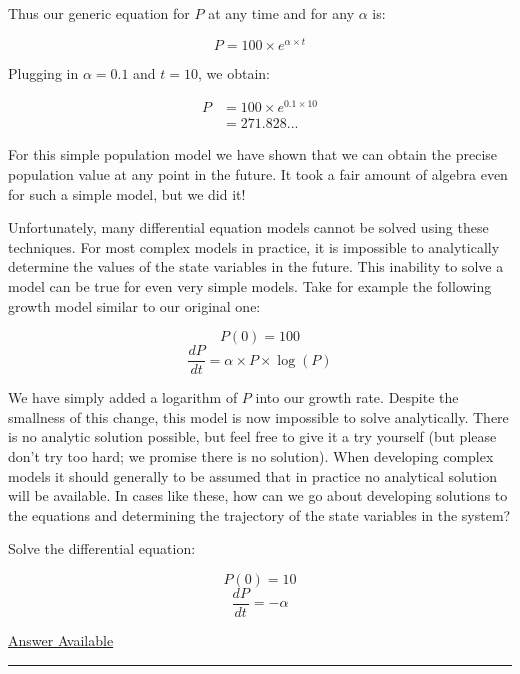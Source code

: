 \documentclass[]{memoir}
\begin{document}
Thus our generic equation for $P$ at any time and for any $\alpha$ is:

\[ P = 100 \times e^{\alpha \times t} \]

Plugging in $\alpha=0.1$ and $t=10$, we obtain:

\[
\begin{aligned}
P &= 100 \times e^{0.1 \times 10} \\
  &= 271.828...
\end{aligned}
\]

For this simple population model we have shown that we can obtain the
precise population value at any point in the future. It took a fair
amount of algebra even for such a simple model, but we did it!

Unfortunately, many differential equation models cannot be solved using
these techniques. For most complex models in practice, it is impossible
to analytically determine the values of the state variables in the
future. This inability to solve a model can be true for even very simple
models. Take for example the following growth model similar to our
original one:

\[ P(0) = 100 \] \[ \frac{dP}{dt} = \alpha \times P \times \log(P) \]

We have simply added a logarithm of $P$ into our growth rate. Despite
the smallness of this change, this model is now impossible to solve
analytically. There is no analytic solution possible, but feel free to
give it a try yourself (but please don't try too hard; we promise there
is no solution). When developing complex models it should generally to
be assumed that in practice no analytical solution will be available. In
cases like these, how can we go about developing solutions to the
equations and determining the trajectory of the state variables in the
system?


Solve the differential equation:

\[ P(0) = 10 \] \[ \frac{dP}{dt} = -\alpha \]

\hyperref[Ans-10-4]{Answer Available}

\begin{center}\rule{3in}{0.4pt}\end{center}

\end{document}
